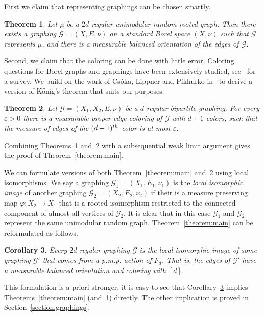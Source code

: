 \documentclass[11pt]{article}
\newtheorem{theo}{Theorem}[section]
\newtheorem{coro}[theo]{Corollary}
\theoremstyle{definition}
\numberwithin{equation}{section}
\numberwithin{figure}{section}
\numberwithin{table}{section}
\newcommand{\G}{\mathcal{G}}
\begin{document}
First we claim that representing graphings can be chosen smartly.

\begin{theo}\label{theorem:balanced_orientation}
Let $\mu$ be a $2d$-regular unimodular random rooted graph. Then there exists a graphing $\G=(X,E,\nu)$ on a standard Borel space $(X, \nu)$ such that $\G$ represents $\mu$, and there is a measurable balanced orientation of the edges of $\G$.
\end{theo}

Second, we claim that the coloring can be done with little error. Coloring questions for Borel graphs and graphings have been extensively studied, see~\cite{kechris2015descriptive} for a survey. We build on the work of Cs{\'o}ka, Lippner and Pikhurko in~\cite{csoka2016kHonig} to derive a version of K{\H o}nig's theorem that suits our purposes.

\begin{theo}\label{theorem:almost_proper_coloring}
Let $\G=(X_1,X_2,E, \nu)$ be a $d$-regular bipartite graphing. For every $\varepsilon > 0$ there is a measurable proper edge coloring of $\G$ with $d+1$ colors, such that the measure of edges of the $(d+1)^{\rm th}$ color is at most $\varepsilon$.
\end{theo}
Combining Theorems~\ref{theorem:balanced_orientation} and~\ref{theorem:almost_proper_coloring} with a subsequential weak limit argument gives the proof of Theorem~\ref{theorem:main}.
%

We can formulate versions of both Theorem~\ref{theorem:main} and~\ref{theorem:almost_proper_coloring} using local isomorphisms. We say a graphing $\G_1=(X_1, E_1, \nu_1)$ is the \emph{local isomorphic image} of another graphing $\G_2=(X_2, E_2, \nu_2)$ if their is a measure preserving map $\varphi: X_2 \to X_1$ that is a rooted isomorphism restricted to the connected component of almost all vertices of $\G_2$. It is clear that in this case $\G_1$ and $\G_2$ represent the same unimodular random graph. Theorem~\ref{theorem:main} can be reformulated as follows.

\begin{coro}\label{corollary:graphing_lift}
Every $2d$-regular graphing $\G$ is the local isomorphic image of some graphing $\G'$ that comes from a p.m.p. action of $F_d$. That is, the edges of $\G'$ have a measurable balanced orientation and coloring with $[d]$.
\end{coro}

This formulation is a priori stronger, it is easy to see that Corollary~\ref{corollary:graphing_lift} implies Theorems~\ref{theorem:main} (and~\ref{theorem:balanced_orientation}) directly. The other implication is proved in Section~\ref{section:graphings}.
\end{document}
